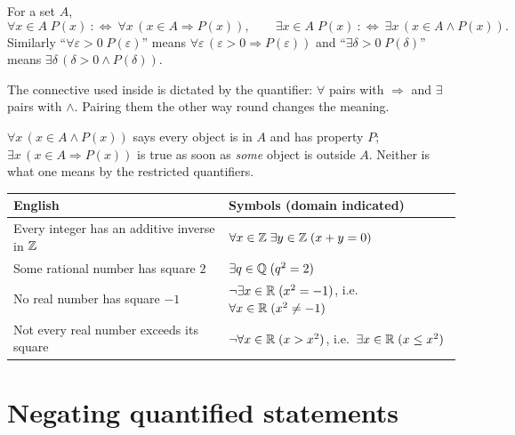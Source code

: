 \begin{definition}\label{def:restricted}
	For a set $A$,
	\[
	\forall x\in A\;P(x)\ :\iff\ \forall x\,(x\in A\Rightarrow P(x)),\qquad
	\exists x\in A\;P(x)\ :\iff\ \exists x\,(x\in A\wedge P(x)).
	\]
	Similarly ``$\forall\varepsilon>0\;P(\varepsilon)$'' means $\forall\varepsilon\,(\varepsilon>0\Rightarrow P(\varepsilon))$ and ``$\exists\delta>0\;P(\delta)$'' means $\exists\delta\,(\delta>0\wedge P(\delta))$.
\end{definition}

The connective used inside is dictated by the quantifier: $\forall$ pairs with $\Rightarrow$ and $\exists$ pairs with $\wedge$. Pairing them the other way round changes the meaning.

\begin{warning}
	$\forall x\,(x\in A\wedge P(x))$ says every object is in $A$ and has property $P$; $\exists x\,(x\in A\Rightarrow P(x))$ is true as soon as \emph{some} object is outside $A$. Neither is what one means by the restricted quantifiers.
\end{warning}

\begin{center}
	\begin{tabular}{@{}p{7.2cm}p{7.6cm}@{}}
		\toprule
		\textbf{English} & \textbf{Symbols (domain indicated)}\\
		\midrule
		Every integer has an additive inverse in $\mathbb{Z}$ & $\forall x\in\mathbb{Z}\;\exists y\in\mathbb{Z}\;(x+y=0)$\\
		Some rational number has square $2$ & $\exists q\in\mathbb{Q}\;(q^2=2)$\\
		No real number has square $-1$ & $\neg\exists x\in\mathbb{R}\;(x^2=-1)$, i.e.\ $\forall x\in\mathbb{R}\;(x^2\ne-1)$\\
		Not every real number exceeds its square & $\neg\forall x\in\mathbb{R}\;(x>x^2)$, i.e.\ $\exists x\in\mathbb{R}\;(x\le x^2)$\\
		\bottomrule
	\end{tabular}
\end{center}

\section{Negating quantified statements}


